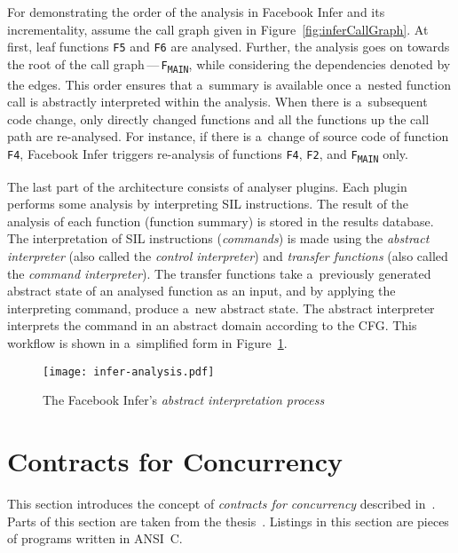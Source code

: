 \begin{example}
    \label{ex:AIAnalysis}
    For demonstrating the order of the analysis in Facebook Infer and its incrementality, assume the call graph given in Figure~\ref{fig:inferCallGraph}. At first, leaf functions \texttt{F5} and \texttt{F6} are analysed. Further, the analysis goes on towards the root of the call graph\,---\,\texttt{F\textsubscript{MAIN}}, while considering the dependencies denoted by the edges. This order ensures that a~summary is available once a~nested function call is abstractly interpreted within the analysis. When there is a~subsequent code change, only directly changed functions and all the functions up the call path are re-analysed. For instance, if there is a~change of source code of function \texttt{F4}, Facebook Infer triggers re-analysis of functions \texttt{F4}, \texttt{F2}, and \texttt{F\textsubscript{MAIN}} only.
\end{example}

The last part of the architecture consists of analyser plugins. Each plugin performs some analysis by interpreting SIL instructions. The result of the analysis of each function (function summary) is stored in the results database. The interpretation of SIL instructions (\emph{commands}) is made using the \emph{abstract interpreter} (also called the \emph{control interpreter}) and \emph{transfer functions} (also called the \emph{command interpreter}). The transfer functions take a~previously generated abstract state of an analysed function as an input, and by applying the interpreting command, produce a~new abstract state. The abstract interpreter interprets the command in an abstract domain according to the CFG. This workflow is shown in a~simplified form in Figure~\ref{fig:inferAnalysis}.

\begin{figure}[hbt]
    \centering
    \texttt{[image: infer-analysis.pdf]}
    \caption{The Facebook Infer's \emph{abstract interpretation process}~\cite{harmimBP}}
    \label{fig:inferAnalysis}
\end{figure}


\section{Contracts for Concurrency}
\label{sec:contracts}


This section introduces the concept of \emph{contracts for concurrency}
described in~\cite{contracts2015, contracts2017}. Parts of this section are
taken from the thesis~\cite{harmimBP}. Listings in this section are
pieces of programs written in ANSI~C.

